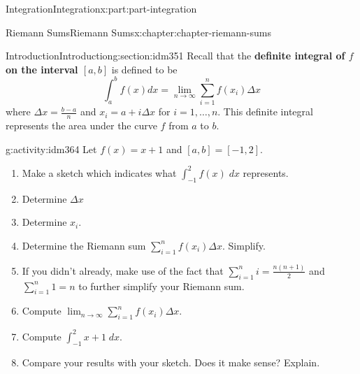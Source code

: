 \documentclass[oneside,10pt,]{book}
\newcommand{\terminology}[1]{\textbf{#1}}
\begin{document}
\begin{partptx}{Integration}{}{Integration}{}{}{x:part:part-integration}
%
\typeout{************************************************}
\typeout{************************************************}
%
\begin{chapterptx}{Riemann Sums}{}{Riemann Sums}{}{}{x:chapter:chapter-riemann-sums}
%
%
\typeout{************************************************}
\typeout{************************************************}
%
\begin{sectionptx}{Introduction}{}{Introduction}{}{}{g:section:idm351}
Recall that the \terminology{definite integral of \(f\) on the interval \([a,b]\)} is defined to be%
\begin{equation*}
\int_a^b f(x) dx = \lim_{n \to \infty} \sum_{i=1}^n f(x_i)\Delta x
\end{equation*}
where \(\displaystyle \Delta x = \frac{b-a}{n}\) and \(x_i = a + i \Delta x\) for \(i = 1, \dots, n\). This definite integral represents the area under the curve \(f\) from \(a\) to \(b\).%
\begin{activity}{}{g:activity:idm364}%
Let \(f(x) = x+1\) and \([a,b] = [-1,2]\).%
\begin{enumerate}[font=\bfseries,label=(\alph*),ref=\alph*]
\item{}Make a sketch which indicates what \(\displaystyle\int_{-1}^2 f(x) \; dx\) represents.\item{}Determine \(\Delta x\)%
\item{}Determine \(x_i\).%
\item{}Determine the Riemann sum \(\displaystyle\sum_{i=1}^n f(x_i) \Delta x\). Simplify.%
\item{}If you didn't already, make use of the fact that \(\displaystyle \sum_{i=1}^n i = \frac{n(n+1)}{2}\) and \(\displaystyle \sum_{i=1}^n 1 = n\) to further simplify your Riemann sum.%
\item{}Compute \(\displaystyle\lim_{n \to \infty} \sum_{i=1}^n f(x_i) \Delta x\).%
\item{}Compute \(\displaystyle\int_{-1}^2 x+1 \; dx\).%
\item{}Compare your results with your sketch. Does it make sense? Explain.%
\end{enumerate}
\end{activity}
\end{sectionptx}
%
%
\typeout{************************************************}
\typeout{************************************************}

\end{chapterptx}
\end{partptx}
\end{document}
